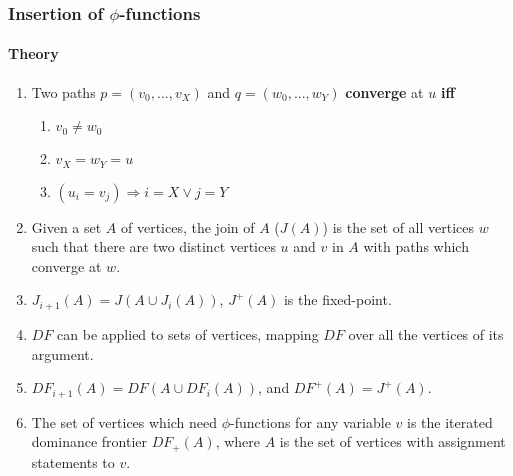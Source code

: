 \documentclass[a4paper,12pt, notitlepage]{article}
\renewcommand{\iff}{\textbf{ iff }}
\begin{document}
\subsubsection*{Insertion of $\phi$-functions}
\paragraph*{Theory}
\begin{enumerate}
\item Two paths $p = (v_0, ..., v_X)$ and $q = (w_0, ..., w_Y)$
\textbf{converge} at $u$ \iff
    \begin{enumerate}
        \item $v_0 \not= w_0$
        \item $v_X = w_Y = u$
        \item $(u_i = v_j) \Rightarrow i = X \lor j = Y$
    \end{enumerate}
\item Given a set $A$ of vertices, the join of $A$ ($J(A)$) is the set of all
vertices $w$ such that there are two distinct vertices $u$ and $v$ in $A$ with
paths which converge at $w$.
\item $J_{i+1}(A) = J(A \cup J_{i}(A))$, $J^+(A)$ is the fixed-point.
\item $DF$ can be applied to sets of vertices, mapping $DF$ over all the
vertices of its argument.
\item $DF_{i+1}(A) = DF(A \cup DF_{i}(A))$, and $DF^+(A) = J^+(A)$.
\item The set of vertices which need $\phi$-functions for any variable $v$
is the iterated dominance frontier $DF_+(A)$, where $A$ is the set of vertices
with assignment statements to $v$.
\end{enumerate}

\pagebreak
\end{document}
